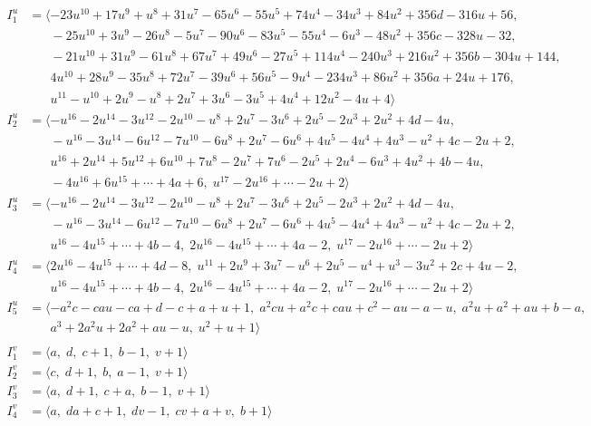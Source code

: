 \documentclass[1p]{elsarticle_modified}
\theoremstyle{definition}
\begin{document}
\begin{align*}
I^u_{1}&=\langle 
-23 u^{10}+17 u^9+u^8+31 u^7-65 u^6-55 u^5+74 u^4-34 u^3+84 u^2+356 d-316 u+56,\\
\phantom{I^u_{1}}&\phantom{= \langle  }-25 u^{10}+3 u^9-26 u^8-5 u^7-90 u^6-83 u^5-55 u^4-6 u^3-48 u^2+356 c-328 u-32,\\
\phantom{I^u_{1}}&\phantom{= \langle  }-21 u^{10}+31 u^9-61 u^8+67 u^7+49 u^6-27 u^5+114 u^4-240 u^3+216 u^2+356 b-304 u+144,\\
\phantom{I^u_{1}}&\phantom{= \langle  }4 u^{10}+28 u^9-35 u^8+72 u^7-39 u^6+56 u^5-9 u^4-234 u^3+86 u^2+356 a+24 u+176,\\
\phantom{I^u_{1}}&\phantom{= \langle  }u^{11}- u^{10}+2 u^9- u^8+2 u^7+3 u^6-3 u^5+4 u^4+12 u^2-4 u+4\rangle \\
I^u_{2}&=\langle 
- u^{16}-2 u^{14}-3 u^{12}-2 u^{10}- u^8+2 u^7-3 u^6+2 u^5-2 u^3+2 u^2+4 d-4 u,\\
\phantom{I^u_{2}}&\phantom{= \langle  }- u^{16}-3 u^{14}-6 u^{12}-7 u^{10}-6 u^8+2 u^7-6 u^6+4 u^5-4 u^4+4 u^3- u^2+4 c-2 u+2,\\
\phantom{I^u_{2}}&\phantom{= \langle  }u^{16}+2 u^{14}+5 u^{12}+6 u^{10}+7 u^8-2 u^7+7 u^6-2 u^5+2 u^4-6 u^3+4 u^2+4 b-4 u,\\
\phantom{I^u_{2}}&\phantom{= \langle  }-4 u^{16}+6 u^{15}+\cdots+4 a+6,\;u^{17}-2 u^{16}+\cdots-2 u+2\rangle \\
I^u_{3}&=\langle 
- u^{16}-2 u^{14}-3 u^{12}-2 u^{10}- u^8+2 u^7-3 u^6+2 u^5-2 u^3+2 u^2+4 d-4 u,\\
\phantom{I^u_{3}}&\phantom{= \langle  }- u^{16}-3 u^{14}-6 u^{12}-7 u^{10}-6 u^8+2 u^7-6 u^6+4 u^5-4 u^4+4 u^3- u^2+4 c-2 u+2,\\
\phantom{I^u_{3}}&\phantom{= \langle  }u^{16}-4 u^{15}+\cdots+4 b-4,\;2 u^{16}-4 u^{15}+\cdots+4 a-2,\;u^{17}-2 u^{16}+\cdots-2 u+2\rangle \\
I^u_{4}&=\langle 
2 u^{16}-4 u^{15}+\cdots+4 d-8,\;u^{11}+2 u^9+3 u^7- u^6+2 u^5- u^4+u^3-3 u^2+2 c+4 u-2,\\
\phantom{I^u_{4}}&\phantom{= \langle  }u^{16}-4 u^{15}+\cdots+4 b-4,\;2 u^{16}-4 u^{15}+\cdots+4 a-2,\;u^{17}-2 u^{16}+\cdots-2 u+2\rangle \\
I^u_{5}&=\langle 
- a^2 c- c a u- c a+d- c+a+u+1,\;a^2 c u+a^2 c+c a u+c^2- a u- a- u,\;a^2 u+a^2+a u+b- a,\\
\phantom{I^u_{5}}&\phantom{= \langle  }a^3+2 a^2 u+2 a^2+a u- u,\;u^2+u+1\rangle \\
\\
I^v_{1}&=\langle 
a,\;d,\;c+1,\;b-1,\;v+1\rangle \\
I^v_{2}&=\langle 
c,\;d+1,\;b,\;a-1,\;v+1\rangle \\
I^v_{3}&=\langle 
a,\;d+1,\;c+a,\;b-1,\;v+1\rangle \\
I^v_{4}&=\langle 
a,\;d a+c+1,\;d v-1,\;c v+a+v,\;b+1\rangle \\
\end{align*}
\end{document}

